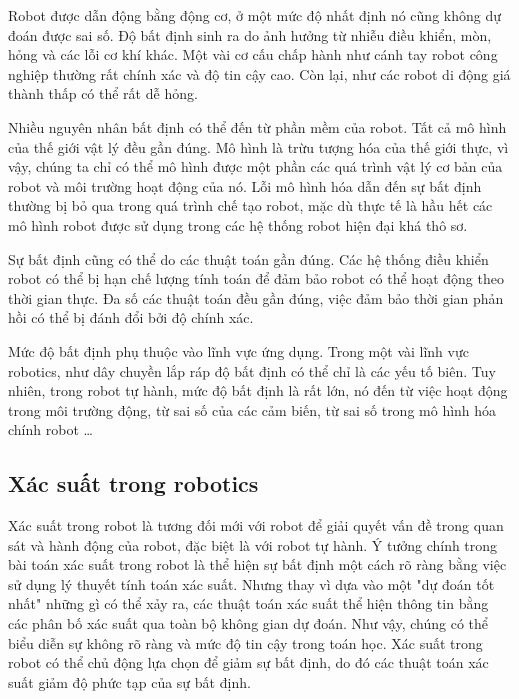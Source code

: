 Robot được dẫn động bằng động cơ, ở một mức độ nhất định nó cũng không dự đoán được sai số. Độ bất định sinh ra do ảnh hưởng từ nhiễu điều khiển, mòn, hỏng và các lỗi cơ khí khác. Một vài cơ cấu chấp hành như cánh tay robot công nghiệp thường rất chính xác và độ tin cậy cao. Còn lại, như các robot di động giá thành thấp có thể rất dễ hỏng.

Nhiều nguyên nhân bất định có thể đến từ phần mềm của robot. Tất cả mô hình của thế giới vật lý đều gần đúng. Mô hình là trừu tượng hóa của thế giới thực, vì vậy, chúng ta chỉ có thể mô hình được một phần các quá trình vật lý cơ bản của robot và môi trường hoạt động của nó. Lỗi mô hình hóa dẫn đến sự bất định thường bị bỏ qua trong quá trình chế tạo robot, mặc dù thực tế là hầu hết các mô hình robot được sử dụng trong các hệ thống robot hiện đại khá thô sơ.

Sự bất định cũng có thể do các thuật toán gần đúng. Các hệ thống điều khiển robot có thể bị hạn chế lượng tính toán để đảm bảo robot có thể hoạt động theo thời gian thực. Đa số các thuật toán đều gần đúng, việc đảm bảo thời gian phản hồi có thể bị đánh đổi bởi độ chính xác.

Mức độ bất định phụ thuộc vào lĩnh vực ứng dụng. Trong một vài lĩnh vực robotics, như dây chuyền lắp ráp độ bất định có thể chỉ là các yếu tố biên. Tuy nhiên, trong robot tự hành, mức độ bất định là rất lớn, nó đến từ việc hoạt động trong môi trường động, từ sai số của các cảm biến, từ sai số trong mô hình hóa chính robot \dots

\subsection{Xác suất trong robotics} \label{subsec:probabilityinRobotics}

Xác suất trong robot là tương đối mới với robot để giải quyết vấn đề trong quan sát và hành động của robot, đặc biệt là với robot tự hành. Ý tưởng chính trong bài toán xác suất trong robot là thể hiện sự bất định một cách rõ ràng bằng việc sử dụng lý thuyết tính toán xác suất. Nhưng thay vì dựa vào một "dự đoán tốt nhất" những gì có thể xảy ra, các thuật toán xác suất thể hiện thông tin bằng các phân bố xác suất qua toàn bộ không gian dự đoán. Như vậy, chúng có thể biểu diễn sự không rõ ràng và mức độ tin cậy trong toán học. Xác suất trong robot có thể chủ động lựa chọn để giảm sự bất định, do đó các thuật toán xác suất giảm độ phức tạp của sự bất định.

